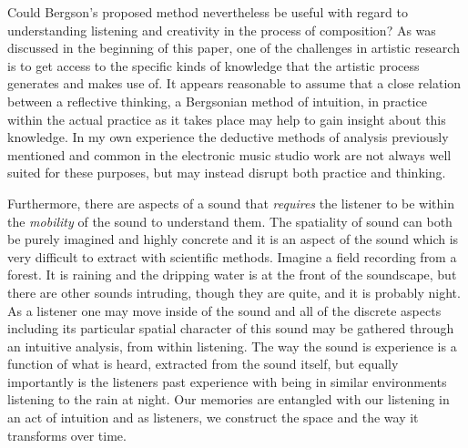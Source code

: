 \documentclass[11pt]{article}
\begin{document}
Could Bergson's proposed method nevertheless be useful with regard to understanding listening and creativity in the process of composition? As was discussed in the beginning of this paper, one of the challenges in artistic research is to get access to the specific kinds of knowledge that the artistic process generates and makes use of. It appears reasonable to assume that a close relation between a reflective thinking, a Bergsonian method of intuition, in practice within the actual practice as it takes place may help to gain insight about this knowledge.
In my own experience the deductive methods of analysis previously mentioned and common in the electronic music studio work are not always well suited for these purposes, but may instead disrupt both practice and thinking.

Furthermore, there are aspects of a sound that \emph{requires} the listener to be within the \emph{mobility} of the sound to understand them. The spatiality of sound can both be purely imagined and highly concrete and it is an aspect of the sound which is very difficult to extract with scientific methods. Imagine a field recording from a forest. It is raining and the dripping water is at the front of the soundscape, but there are other sounds intruding, though they are quite, and it is probably night. As a listener one may move inside of the sound and all of the discrete aspects including its particular spatial character of this sound may be gathered through an intuitive analysis, from within listening.
The way the sound is experience is a function of what is heard, extracted from the sound itself, but equally importantly is the listeners past experience with being in similar environments listening to the rain at night. Our memories are entangled with our listening in an act of intuition and as listeners, we construct the space and the way it transforms over time.
\end{document}

